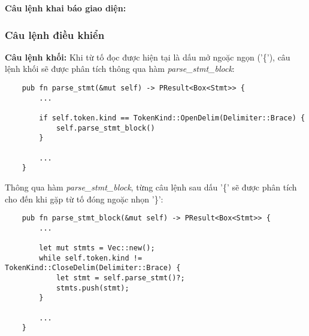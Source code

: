 \textbf{Câu lệnh khai báo giao diện:}


\subsubsection{Câu lệnh điều khiển}
\textbf{Câu lệnh khối:} Khi từ tố đọc được hiện tại là dấu mở ngoặc ngọn ('\{'), câu lệnh khối sẽ được phân tích thông qua hàm \textit{parse\_stmt\_block}:
\begin{lstlisting}
    pub fn parse_stmt(&mut self) -> PResult<Box<Stmt>> {
        ...    

        if self.token.kind == TokenKind::OpenDelim(Delimiter::Brace) {
            self.parse_stmt_block()
        } 
        
        ...
    }
\end{lstlisting}
Thông qua hàm \textit{parse\_stmt\_block}, từng câu lệnh sau dấu '\{' sẽ được phân tích cho đến khi gặp từ tố đóng ngoặc nhọn '\}':
\begin{lstlisting}
    pub fn parse_stmt_block(&mut self) -> PResult<Box<Stmt>> {
        ...

        let mut stmts = Vec::new();
        while self.token.kind != TokenKind::CloseDelim(Delimiter::Brace) {
            let stmt = self.parse_stmt()?;
            stmts.push(stmt);
        }

        ...
    }
\end{lstlisting}

